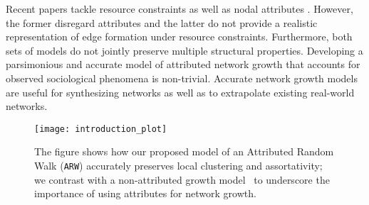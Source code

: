 Recent papers tackle resource constraints
\cite{mossa2002truncation,zeng2005construction,wang2009local} as well as nodal
attributes \cite{de2013scale,gong2012evolution}. However, the former disregard
attributes and the latter do not provide a realistic representation of edge
formation under resource constraints. Furthermore, both sets of models do not
jointly preserve multiple structural properties. Developing a parsimonious and
accurate model of attributed network growth that accounts for observed
sociological phenomena is non-trivial. Accurate network growth models are useful
for synthesizing networks as well as to extrapolate existing real-world
networks.




\begin{figure}[t]
	\centering
	\texttt{[image: introduction\_plot]}
    \vspace{1pt}
    \caption{The figure shows how our proposed model of an Attributed Random Walk (\texttt{ARW}) accurately preserves local clustering and assortativity; we contrast with a non-attributed growth model~\cite{holme2002growing} to underscore the importance of using attributes for network growth.}
	\label{fig:intro_plot}
\end{figure}


